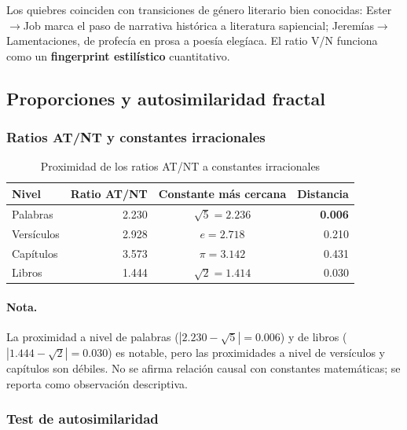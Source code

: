 \documentclass[12pt,a4paper]{article}
\newcommand{\val}[1]{\textcolor{hlcolor}{\textbf{#1}}}
\begin{document}
Los quiebres coinciden con transiciones de g\'enero literario bien conocidas:
Ester$\to$Job marca el paso de narrativa hist\'orica a literatura sapiencial;
Jerem\'ias$\to$Lamentaciones, de profec\'ia en prosa a poes\'ia eleg\'iaca.
El ratio V/N funciona como un \textbf{fingerprint estil\'istico} cuantitativo.

\subsection{Proporciones y autosimilaridad fractal}

\subsubsection{Ratios AT/NT y constantes irracionales}

\begin{table}[H]
\centering
\caption{Proximidad de los ratios AT/NT a constantes irracionales}
\label{tab:irrationals}
\begin{tabular}{lrcr}
\toprule
\textbf{Nivel} & \textbf{Ratio AT/NT} & \textbf{Constante m\'as cercana} & \textbf{Distancia} \\
\midrule
Palabras     & 2.230 & $\sqrt{5} = 2.236$ & \val{0.006} \\
Vers\'iculos & 2.928 & $e = 2.718$         & 0.210 \\
Cap\'itulos  & 3.573 & $\pi = 3.142$       & 0.431 \\
Libros       & 1.444 & $\sqrt{2} = 1.414$  & 0.030 \\
\bottomrule
\end{tabular}
\end{table}

\paragraph{Nota.}
La proximidad a nivel de palabras ($|2.230 - \sqrt{5}| = 0.006$) y de libros
($|1.444 - \sqrt{2}| = 0.030$) es notable, pero las proximidades a nivel de
vers\'iculos y cap\'itulos son d\'ebiles. No se afirma relaci\'on causal con
constantes matem\'aticas; se reporta como observaci\'on descriptiva.

\subsubsection{Test de autosimilaridad}
\end{document}
